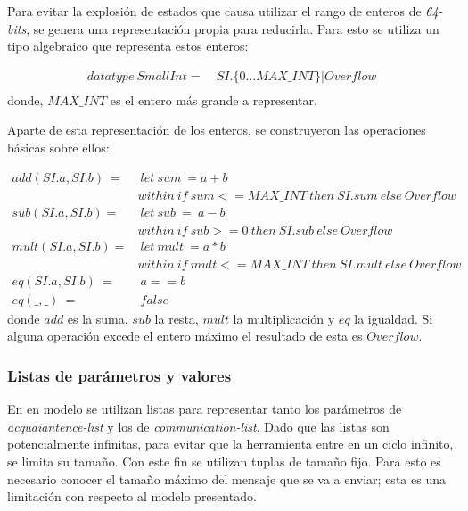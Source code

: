 Para evitar la explosión de estados que causa utilizar el rango de enteros de \textit{64-bits}, se genera una representación propia para reducirla. Para esto se utiliza un tipo algebraico que representa estos enteros:

\begin{align*}
datatype\ SmallInt =&\ SI.\{0 \ldots MAX\_INT\} | Overflow \\
\end{align*}
donde, $MAX\_INT$ es el entero más grande a representar. 

Aparte de esta representación de los enteros, se construyeron las operaciones básicas sobre ellos:

\begin{align*}
add(SI.a, SI.b)\ =&\ let\ sum\ = a + b \\
&within\ if\ sum <= MAX\_INT\ then\ SI.sum\ else\ Overflow  \\
%
sub(SI.a, SI.b) =&\ let\ sub\ =\ a - b \\
& within\ if\ sub >= 0\ then\ SI.sub\ else\ Overflow \\
%
mult(SI.a, SI.b) =&\ let\ mult\ = a * b \\
& within\ if\ mult <= MAX\_INT\ then\ SI.mult\ else\ Overflow \\
eq(SI.a, SI.b)\ =&\ a == b \\
eq(\_, \_)\ =&\ false
\end{align*}
donde $add$ es la suma, $sub$ la resta, $mult$ la multiplicación y $eq$ la igualdad. Si alguna operación excede el entero máximo el resultado de esta es $Overflow$.

\subsubsection*{Listas de parámetros y valores}
En en modelo se utilizan listas para representar tanto los parámetros de \textit{acquaiantence-list} y los de \textit{communication-list}. Dado que las listas son potencialmente infinitas, para evitar que la herramienta entre en un ciclo infinito, se limita su tamaño. Con este fin se utilizan tuplas de tamaño fijo. Para esto es necesario conocer el tamaño máximo del mensaje que se va a enviar; esta es una limitación con respecto al modelo presentado.


